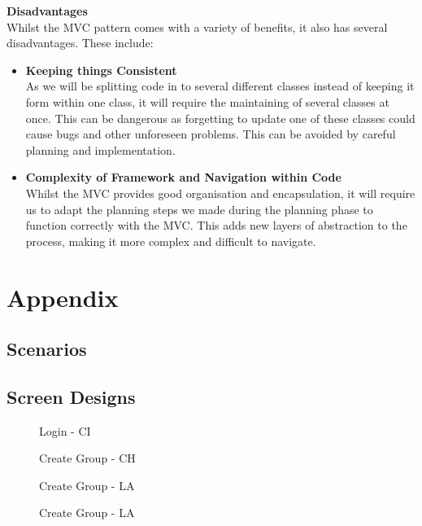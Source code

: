 \documentclass[a4paper]{article}
\begin{document}
\textbf{Disadvantages} \\
Whilst the MVC pattern comes with a variety of benefits, it also has several disadvantages. These include:
\begin{itemize}
    \item \textbf{Keeping things Consistent} \\
    As we will be splitting code in to several different classes instead of keeping it form within one class, it will require the maintaining of several classes at once. This can be dangerous as forgetting to update one of these classes could cause bugs and other unforeseen problems. This can be avoided by careful planning and implementation. \\
    \item \textbf{Complexity of Framework and Navigation within Code} \\
    Whilst the MVC provides good organisation and encapsulation, it will require us to adapt the planning steps we made during the planning phase to function correctly with the MVC. This adds new layers of abstraction to the process, making it more complex and difficult to navigate.
\end{itemize}

\section{Appendix}
\subsection{Scenarios}




\clearpage
\subsection{Screen Designs}
\begin{figure}[!ht]
    \centering{} %
    \caption{Login - CI}
    \label{fig:login}
\end{figure}

\begin{figure}[!ht] 
    \centering{} %
    \caption{Create Group - CH}
    \label{fig:create_group}
\end{figure}

\begin{figure}[!ht]
    \centering{} %
    \caption{Create Group - LA}
    \label{fig:create_event_cal}
\end{figure}

\begin{figure}[!ht]
    \centering{} %
    \caption{Create Group - LA}
    \label{fig:create_event}
\end{figure}
\end{document}
